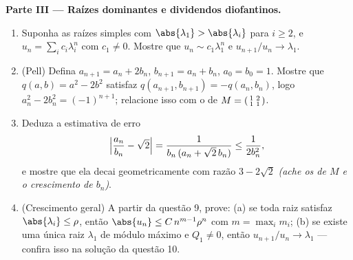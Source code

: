 \begin{problem}
\medskip
\noindent\textbf{Parte III --- Raízes dominantes e dividendos
diofantinos.}
\begin{enumerate}[resume]
  \item Suponha as raízes simples com $\abs{\lambda_1} >
        \abs{\lambda_i}$ para $i \geq 2$, e $u_n = \sum_i c_i
        \lambda_i^n$ com $c_1 \neq 0$. Mostre que $u_n \sim
        c_1\lambda_1^n$ e $u_{n+1}/u_n \to \lambda_1$.
  \item (Pell) Defina $a_{n+1} = a_n + 2b_n$, $b_{n+1} = a_n +
        b_n$, $a_0 = b_0 = 1$. Mostre que $q(a, b) = a^2 - 2b^2$
        satisfaz $q(a_{n+1}, b_{n+1}) = -q(a_n, b_n)$, logo
        $a_n^2 - 2b_n^2 = (-1)^{n+1}$; relacione isso com o
         de $M = \begin{psmallmatrix}1 & 2\\ 1 &
        1\end{psmallmatrix}$.
  \item Deduza a estimativa de erro
        \[
        \Bigl|\frac{a_n}{b_n} - \sqrt2\Bigr|
        = \frac{1}{b_n\,(a_n + \sqrt2\,b_n)}
        \leq \frac{1}{2b_n^2},
        \]
        e mostre que ela decai geometricamente com razão $3 -
        2\sqrt2$ \emph{(ache os  de $M$ e o
        crescimento de $b_n$)}.
  \item (Crescimento geral) A partir da questão 9, prove: (a) se toda
        raiz satisfaz $\abs{\lambda_i} \leq \rho$, então
        $\abs{u_n} \leq C\,n^{m-1}\rho^n$ com $m = \max_i m_i$;
        (b) se existe uma única raiz $\lambda_1$ de módulo
        máximo e $Q_1 \neq 0$, então $u_{n+1}/u_n \to
        \lambda_1$ --- confira isso na solução da questão 10.
\end{enumerate}


\end{problem}

